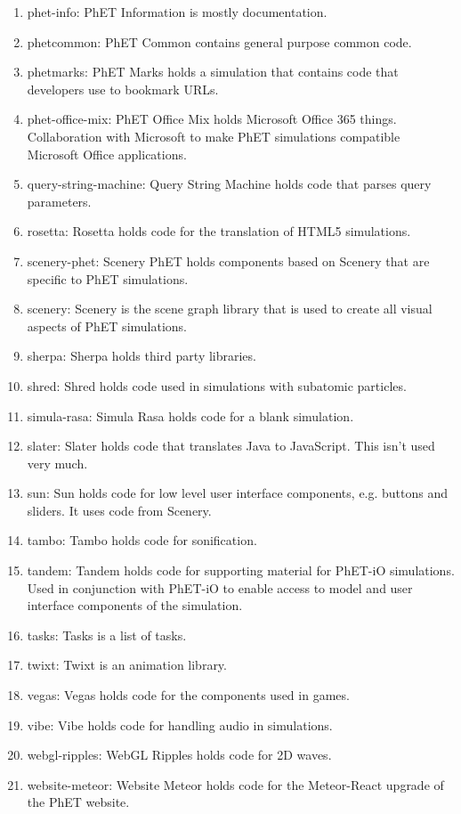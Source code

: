 \documentclass[titlepage]{article}
\begin{document}
\begin{enumerate}
			\item phet-info: PhET Information is mostly documentation.
			\item phetcommon: PhET Common contains general purpose common code.
			\item phetmarks: PhET Marks holds a simulation that contains code that developers use to bookmark URLs.
			\item phet-office-mix: PhET Office Mix holds Microsoft Office 365 things. Collaboration with Microsoft to make PhET simulations compatible Microsoft Office applications.
			\item query-string-machine: Query String Machine holds code that parses query parameters.
			\item rosetta: Rosetta holds code for the translation of HTML5 simulations.
			\item scenery-phet: Scenery PhET holds components based on Scenery that are specific to PhET simulations.
			\item scenery: Scenery is the scene graph library that is used to create all visual aspects of PhET simulations.
			\item sherpa: Sherpa holds third party libraries.
			\item shred: Shred holds code used in simulations with subatomic particles.
			\item simula-rasa: Simula Rasa holds code for a blank simulation.
			\item slater: Slater holds code that translates Java to JavaScript. This isn't used very much.
			\item sun: Sun holds code for low level user interface components, e.g. buttons and sliders. It uses code from Scenery.
			\item tambo: Tambo holds code for sonification.
			\item tandem: Tandem holds code for supporting material for PhET-iO simulations. Used in conjunction with PhET-iO to enable access to model and user interface components of the simulation.
			\item tasks: Tasks is a list of tasks.
			\item twixt: Twixt is an animation library. 
			\item vegas: Vegas holds code for the components used in games.
			\item vibe: Vibe holds code for handling audio in simulations.
			\item webgl-ripples: WebGL Ripples holds code for 2D waves.
			\item website-meteor: Website Meteor holds code for the Meteor-React upgrade of the PhET website.
		\end{enumerate}
\end{document}
